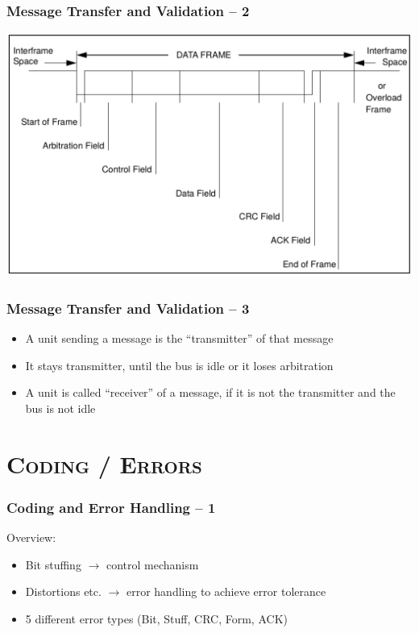 \documentclass[xcolor=x11names,compress]{beamer}
\renewcommand{\(}{\begin{columns}}
\renewcommand{\)}{\end{columns}}
\newcommand{\<}[1]{\begin{column}{#1}}
\renewcommand{\>}{\end{column}}
\begin{document}
\begin{frame}
  \frametitle{Message Transfer and Validation -- 2}
  
    \centering
    \includegraphics[scale=0.2]{framesetup}

\end{frame}

\begin{frame}
  \frametitle{Message Transfer and Validation -- 3}
  
  \begin{itemize}
    \item A unit sending a message is the ``transmitter'' of that message
    \item It stays transmitter, until the bus is idle or it loses arbitration
    \item A unit is called ``receiver'' of a message, if it is not the transmitter and the bus is not idle
  \end{itemize}

\end{frame}



\section{\scshape Coding / Errors}
\begin{frame}
  \frametitle{Coding and Error Handling -- 1}

  Overview:
  \begin{itemize}
    \item Bit stuffing $\rightarrow$ control mechanism
    \item Distortions etc. $\rightarrow$ error handling to achieve error tolerance
    \item 5 different error types (Bit, Stuff, CRC, Form, ACK)
  \end{itemize}

\end{frame}
\end{document}
